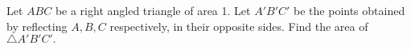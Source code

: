 Let $ ABC$ be a right angled triangle of area 1. Let $ A'B'C'$ be the points obtained by reflecting $ A,B,C$ respectively, in their opposite sides. Find the area of $ \triangle A'B'C'.$